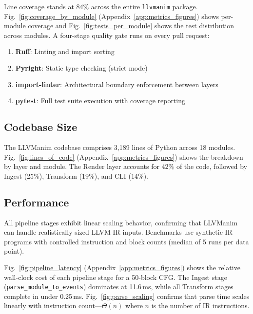 


Line coverage stands at 84\% across the entire \texttt{llvmanim} package. Fig.~\ref{fig:coverage_by_module} (Appendix~\ref{app:metrics_figures}) shows per-module coverage and Fig.~\ref{fig:tests_per_module} shows the test distribution across modules. A four-stage quality gate runs on every pull request:
\begin{enumerate}
    \item \textbf{Ruff}: Linting and import sorting
    \item \textbf{Pyright}: Static type checking (strict mode)
    \item \textbf{import-linter}: Architectural boundary enforcement between layers
    \item \textbf{pytest}: Full test suite execution with coverage reporting
\end{enumerate}


\subsection{Codebase Size}
The LLVManim codebase comprises 3{,}189 lines of Python across 18 modules. Fig.~\ref{fig:lines_of_code} (Appendix~\ref{app:metrics_figures}) shows the breakdown by layer and module. The Render layer accounts for 42\% of the code, followed by Ingest (25\%), Transform (19\%), and CLI (14\%).


\subsection{Performance}
All pipeline stages exhibit linear scaling behavior, confirming that LLVManim can handle realistically sized LLVM IR inputs. Benchmarks use synthetic IR programs with controlled instruction and block counts (median of 5 runs per data point).

Fig.~\ref{fig:pipeline_latency} (Appendix~\ref{app:metrics_figures}) shows the relative wall-clock cost of each pipeline stage for a 50-block CFG. The Ingest stage (\texttt{parse\_module\_to\_events}) dominates at 11.6\,ms, while all Transform stages complete in under 0.25\,ms. Fig.~\ref{fig:parse_scaling} confirms that parse time scales linearly with instruction count---$\Theta(n)$ where $n$ is the number of IR instructions.





